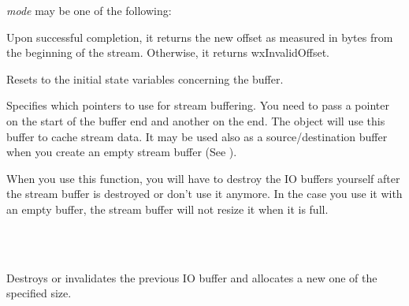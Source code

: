 {\it mode} may be one of the following:

\twocolwidtha{5cm}
\begin{twocollist}\itemsep=0pt
\end{twocollist}


Upon successful completion, it returns the new offset as measured in bytes from
the beginning of the stream. Otherwise, it returns wxInvalidOffset.

\label{wxstreambufferresetbuffer}


Resets to the initial state variables concerning the buffer.

\label{wxstreambuffersetbufferio}


Specifies which pointers to use for stream buffering. You need to pass a pointer on the
start of the buffer end and another on the end. The object will use this buffer
to cache stream data. It may be used also as a source/destination buffer when
you create an empty stream buffer (See ).


When you use this function, you will have to destroy the IO buffers yourself
after the stream buffer is destroyed or don't use it anymore.
In the case you use it with an empty buffer, the stream buffer will not resize
it when it is full.


\\
\\


Destroys or invalidates the previous IO buffer and allocates a new one of the
specified size.

